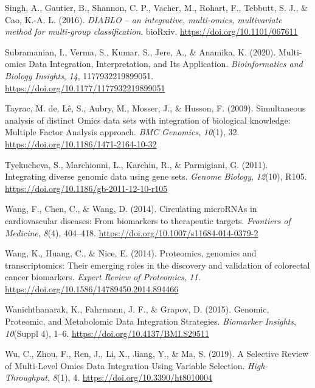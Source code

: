 \documentclass[a4paper, nobind]{templates/ociamthesis}
\newlength{\cslhangindent}
\newenvironment{CSLReferences}[2] %
 {%
  \setlength{\parindent}{0pt}
  \ifodd #1
  \let\oldpar\par
  \def\par{\hangindent=\cslhangindent\oldpar}
  \fi
  \setlength{\parskip}{1mm}
  \setlength{\baselineskip}{6mm}
 }%
 {}
\begin{document}
\begin{CSLReferences}{1}{0}
\leavevmode{}%
Singh, A., Gautier, B., Shannon, C. P., Vacher, M., Rohart, F., Tebbutt, S. J., \& Cao, K.-A. L. (2016). \emph{{DIABLO} -- an integrative, multi-omics, multivariate method for multi-group classification}. bioRxiv. \url{https://doi.org/10.1101/067611}

\leavevmode{}%
Subramanian, I., Verma, S., Kumar, S., Jere, A., \& Anamika, K. (2020). Multi-omics {Data} {Integration}, {Interpretation}, and {Its} {Application}. \emph{Bioinformatics and Biology Insights}, \emph{14}, 1177932219899051. \url{https://doi.org/10.1177/1177932219899051}

\leavevmode{}%
Tayrac, M. de, Lê, S., Aubry, M., Mosser, J., \& Husson, F. (2009). Simultaneous analysis of distinct {Omics} data sets with integration of biological knowledge: {Multiple} {Factor} {Analysis} approach. \emph{BMC Genomics}, \emph{10}(1), 32. \url{https://doi.org/10.1186/1471-2164-10-32}

\leavevmode{}%
Tyekucheva, S., Marchionni, L., Karchin, R., \& Parmigiani, G. (2011). Integrating diverse genomic data using gene sets. \emph{Genome Biology}, \emph{12}(10), R105. \url{https://doi.org/10.1186/gb-2011-12-10-r105}

\leavevmode{}%
Wang, F., Chen, C., \& Wang, D. (2014). Circulating {microRNAs} in cardiovascular diseases: From biomarkers to therapeutic targets. \emph{Frontiers of Medicine}, \emph{8}(4), 404--418. \url{https://doi.org/10.1007/s11684-014-0379-2}

\leavevmode{}%
Wang, K., Huang, C., \& Nice, E. (2014). Proteomics, genomics and transcriptomics: {Their} emerging roles in the discovery and validation of colorectal cancer biomarkers. \emph{Expert Review of Proteomics}, \emph{11}. \url{https://doi.org/10.1586/14789450.2014.894466}

\leavevmode{}%
Wanichthanarak, K., Fahrmann, J. F., \& Grapov, D. (2015). Genomic, {Proteomic}, and {Metabolomic} {Data} {Integration} {Strategies}. \emph{Biomarker Insights}, \emph{10}(Suppl 4), 1--6. \url{https://doi.org/10.4137/BMI.S29511}

\leavevmode{}%
Wu, C., Zhou, F., Ren, J., Li, X., Jiang, Y., \& Ma, S. (2019). A {Selective} {Review} of {Multi}-{Level} {Omics} {Data} {Integration} {Using} {Variable} {Selection}. \emph{High-Throughput}, \emph{8}(1), 4. \url{https://doi.org/10.3390/ht8010004}

\end{CSLReferences}

\end{document}
